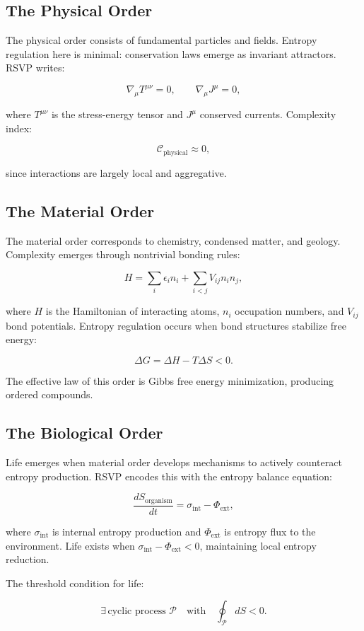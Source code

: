 \documentclass[12pt]{book}
\begin{document}
\subsection{The Physical Order}
The physical order consists of fundamental particles and fields. Entropy regulation here is minimal: conservation laws emerge as invariant attractors. RSVP writes:

\[ \nabla_\mu T^{\mu\nu} = 0, \qquad \nabla_\mu J^\mu = 0, \]

where \( T^{\mu\nu} \) is the stress-energy tensor and \( J^\mu \) conserved currents. Complexity index:

\[ \mathcal{C}_{\text{physical}} \approx 0, \]

since interactions are largely local and aggregative.

\subsection{The Material Order}
The material order corresponds to chemistry, condensed matter, and geology. Complexity emerges through nontrivial bonding rules:

\[ H = \sum_i \epsilon_i n_i + \sum_{i<j} V_{ij} n_i n_j, \]

where \( H \) is the Hamiltonian of interacting atoms, \( n_i \) occupation numbers, and \( V_{ij} \) bond potentials. Entropy regulation occurs when bond structures stabilize free energy:

\[ \Delta G = \Delta H - T \Delta S < 0. \]

The effective law of this order is Gibbs free energy minimization, producing ordered compounds.

\subsection{The Biological Order}
Life emerges when material order develops mechanisms to actively counteract entropy production. RSVP encodes this with the entropy balance equation:

\[ \frac{dS_{\text{organism}}}{dt} = \sigma_{\text{int}} - \Phi_{\text{ext}}, \]

where \( \sigma_{\text{int}} \) is internal entropy production and \( \Phi_{\text{ext}} \) is entropy flux to the environment. Life exists when \( \sigma_{\text{int}} - \Phi_{\text{ext}} < 0 \), maintaining local entropy reduction.

The threshold condition for life:

\[ \exists \, \text{cyclic process } \mathcal{P} \quad \text{with} \quad \oint_{\mathcal{P}} dS < 0. \]
\end{document}
